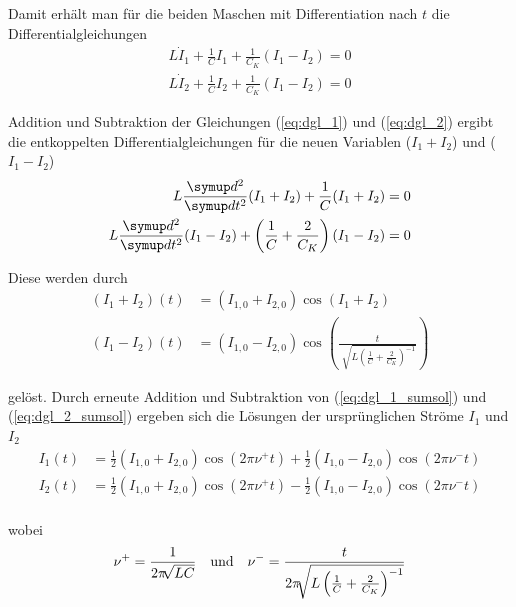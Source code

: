 Damit erhält man für die beiden Maschen mit Differentiation nach $t$ die Differentialgleichungen
\begin{align}  
    L {\dot{I}}_{1} + \frac{1}{C} I_{1} + \frac{1}{C_{K}} (I_{1} - I_{2})  = 0 \label{eq:dgl_1} \\
    L {\dot{I}}_{2} + \frac{1}{C} I_{2} + \frac{1}{C_{K}} (I_{1} - I_{2})  = 0 \label{eq:dgl_2}
\end{align}

Addition und Subtraktion der Gleichungen (\ref{eq:dgl_1}) und (\ref{eq:dgl_2}) ergibt die entkoppelten 
Differentialgleichungen für die neuen Variablen ($I_{1}+I_{2}$) und ($I_{1}-I_{2}$)
\begin{align} 
    L \frac {\dif{^2}} {\dif{t^2}} (I_{1} + I_{2}) + \frac{1}{C} (I_{1} + I_{2})  = 0 \label{eq:dgl_1_entk} \\
    L \frac {\dif{^2}} {\dif{t^2}} (I_{1} - I_{2}) + \left( \frac{1}{C} + \frac{2}{C_{K}} \right) (I_{1} - I_{2})  = 0 \label{eq:dgl_2_entk}
\end{align}

Diese werden durch
\begin{align}
    (I_{1} + I_{2})(t) &= (I_{1,0} + I_{2,0}) \cos(I_{1} + I_{2}) \label{eq:dgl_1_sumsol} \\
    (I_{1} - I_{2})(t) &= (I_{1,0} - I_{2,0}) \cos \left( \frac {t} {{\sqrt [] {L \left( \frac{1}{C} + \frac{2}{C_{K}} \right)^{-1} }}} \right) \label{eq:dgl_2_sumsol}
\end{align}

gelöst. Durch erneute Addition und Subtraktion von (\ref{eq:dgl_1_sumsol}) und (\ref{eq:dgl_2_sumsol}) ergeben sich die Lösungen 
der ursprünglichen Ströme $I_{1}$ und $I_{2}$
\begin{align}
    I_{1}(t) &= \frac{1}{2} (I_{1,0} + I_{2,0}) \cos(2 \pi \nu^+ t)  +  \frac{1}{2} (I_{1,0} - I_{2,0}) \cos(2 \pi \nu^- t) \label{eq:dgl_1_sol} \\
    I_{2}(t) &= \frac{1}{2} (I_{1,0} + I_{2,0}) \cos(2 \pi \nu^+ t)  -  \frac{1}{2} (I_{1,0} - I_{2,0}) \cos(2 \pi \nu^- t) \label{eq:dgl_2_sol} \\
\end{align}

wobei 
\begin{align}
    \nu^+ &= \frac {1} {2 \pi \sqrt[]{LC}} & \mbox{\centering und} && \nu^- = \frac {t} {2 \pi \sqrt [] {L \left( \frac{1}{C} + \frac{2}{C_{K}} \right)^{-1} }}
\end{align}

